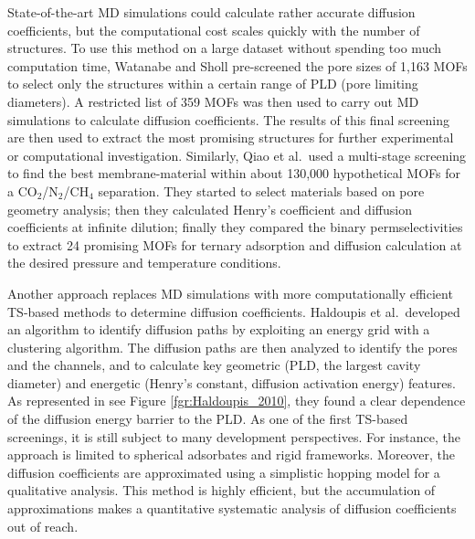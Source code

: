 \documentclass[main.tex]{subfiles}
\begin{document}
State-of-the-art MD simulations could calculate rather accurate diffusion coefficients, but the computational cost scales quickly with the number of structures. To use this method on a large dataset without spending too much computation time, Watanabe and Sholl pre-screened the pore sizes of 1,163 MOFs to select only the structures within a certain range of PLD (pore limiting diameters).\cite{Watanabe_2012} A restricted list of 359 MOFs was then used to carry out MD simulations to calculate diffusion coefficients. The results of this final screening are then used to extract the most promising structures for further experimental or computational investigation. Similarly, Qiao et al.\ used a multi-stage screening to find the best membrane-material within about 130,000 hypothetical MOFs for a CO$_2$/N$_2$/CH$_4$ separation.\cite{Qiao_2016} They started to select materials based on pore geometry analysis; then they calculated Henry's coefficient and diffusion coefficients at infinite dilution; finally they compared the binary permselectivities to extract 24 promising MOFs for ternary adsorption and diffusion calculation at the desired pressure and temperature conditions.

Another approach replaces MD simulations with more computationally efficient TS-based methods to determine diffusion coefficients.
Haldoupis et al.\ developed an algorithm to identify diffusion paths by exploiting an energy grid with a clustering algorithm. The diffusion paths are then analyzed to identify the pores and the channels, and to calculate key geometric (PLD, the largest cavity diameter) and energetic (Henry's constant, diffusion activation energy) features.\cite{Haldoupis_2010}
As represented in see Figure \ref{fgr:Haldoupis_2010}, they found a clear dependence of the diffusion energy barrier to the PLD. As one of the first TS-based screenings, it is still subject to many development perspectives. For instance, the approach is limited to spherical adsorbates and rigid frameworks. Moreover, the diffusion coefficients are approximated using a simplistic hopping model for a qualitative analysis. This method is highly efficient, but the accumulation of approximations makes a quantitative systematic analysis of diffusion coefficients out of reach.
\end{document}
